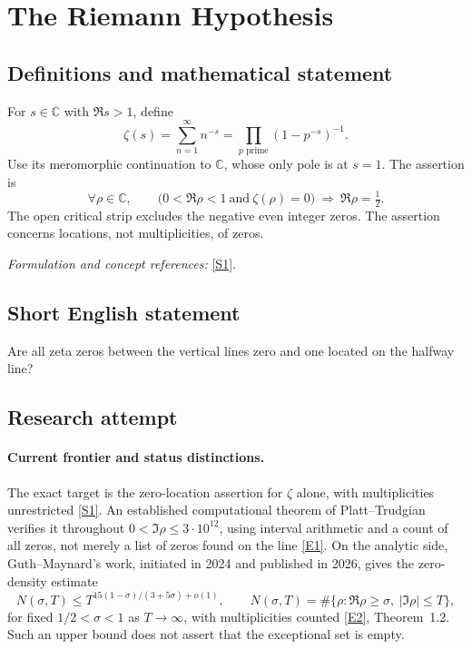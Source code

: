 \documentclass[11pt]{article}
\newcommand{\C}{\mathbb{C}}
\newcommand{\sref}[2]{\hyperlink{source:#1:#2}{[S#2]}}
\newcommand{\eref}[2]{\hyperlink{extra:#1:#2}{[E#2]}}
\newif\ifshowcatalogue
\newcommand{\cataloguescope}[1]{\ifshowcatalogue
 \paragraph{Exact scope in the supplied catalogue.}
 \begin{quote}\small #1\end{quote}\fi}
\begin{document}
\setcounter{section}{0}
\clearpage
\section*{\texorpdfstring{The Riemann Hypothesis}{The Riemann Hypothesis}}\label{statement}
\subsection{Definitions and mathematical statement}
For $s\in\C$ with $\Re s>1$, define
\[
 \zeta(s)=\sum_{n=1}^{\infty}n^{-s}=\prod_{p\text{ prime}}(1-p^{-s})^{-1}.
\]
Use its meromorphic continuation to $\C$, whose only pole is at $s=1$. The assertion is
\[
 \forall\rho\in\C,\qquad \bigl(0<\Re\rho<1\ \text{and}\ \zeta(\rho)=0\bigr)
 \ \Longrightarrow\ \Re\rho=\tfrac12.
\]
The open critical strip excludes the negative even integer zeros. The assertion concerns locations, not multiplicities, of zeros.
\par\smallskip\textit{Formulation and concept references:} \sref{statement}{1}.
\cataloguescope{For the meromorphic continuation of the Riemann zeta function zeta(s)=sum\_\{n>=1\} n\textasciicircum{}(-s), initially defined for Re(s)>1, every zero s in the open critical strip 0<Re(s)<1 has Re(s)=1/2. This is the Riemann Hypothesis for zeta alone; it does not assert simplicity of its zeros.}
\subsection{Short English statement}
Are all zeta zeros between the vertical lines zero and one located on the halfway line?
\subsection{Research attempt}

\paragraph{Current frontier and status distinctions.}
The exact target is the zero-location assertion for $\zeta$ alone, with
multiplicities unrestricted \sref{statement}{1}. An established computational theorem
of Platt--Trudgian verifies it throughout $0<\Im\rho\le 3\cdot10^{12}$,
using interval arithmetic and a count of all zeros, not merely a list of zeros
found on the line \eref{statement}{1}. On the analytic side, Guth--Maynard's work,
initiated in 2024 and published in 2026, gives the zero-density estimate
\[
 N(\sigma,T)\le T^{15(1-\sigma)/(3+5\sigma)+o(1)},
 \qquad N(\sigma,T)=\#\{\rho:\Re\rho\ge\sigma,\ |\Im\rho|\le T\},
\]
for fixed $1/2<\sigma<1$ as $T\to\infty$, with multiplicities counted
\eref{statement}{2}, Theorem~1.2. Such an upper bound does
not assert that the exceptional set is empty.
\end{document}
